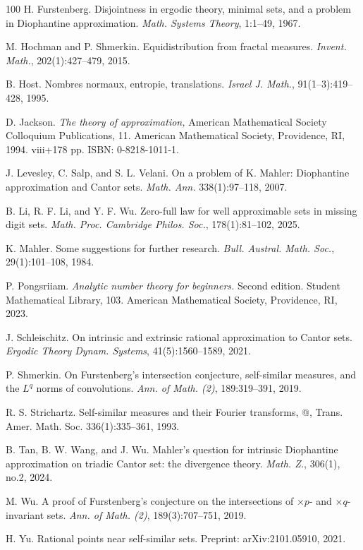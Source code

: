 \documentclass[amssymb,amsfonts,refcheck,12pt,verbatim,righttag]{amsart}
\makeatletter
\numberwithin{equation}{section} %
\theoremstyle{plain}
\newcommand{\Rmnum}[1]{\expandafter\@slowromancap\romannumeral #1@}
\makeatother
\begin{document}
\begin{thebibliography}{100}
H. Furstenberg.
Disjointness in ergodic theory, minimal sets, and a problem in Diophantine approximation.
{\em Math. Systems Theory}, 1:1--49,  1967.

M. Hochman and P. Shmerkin.
Equidistribution from fractal measures. 
{\em Invent. Math.}, 202(1):427--479, 2015.

B. Host.
Nombres normaux, entropie, translations. 
{\em Israel J. Math.}, 91(1--3):419--428, 1995.

 D. Jackson. \textit{The theory of approximation,} American Mathematical Society Colloquium Publications, 11. American Mathematical Society, Providence, RI, 1994. viii+178 pp. ISBN: 0-8218-1011-1.


J. Levesley, C. Salp, and S. L. Velani.
On a problem of K. Mahler: Diophantine approximation and Cantor sets. 
{\em Math. Ann.} 338(1):97--118, 2007.

B. Li, R. F. Li, and Y. F. Wu.
Zero-full law for well approximable sets in missing digit sets. 
{\em Math. Proc. Cambridge Philos. Soc.}, 178(1):81--102, 2025.

K. Mahler. Some suggestions for further research. {\em  Bull. Austral. Math. Soc.}, 29(1):101--108, 1984.

P. Pongsriiam.
{\em Analytic number theory for beginners.}
Second edition. Student Mathematical Library, 103. American Mathematical Society, Providence, RI, 2023.


J. Schleischitz. On intrinsic and extrinsic rational approximation to Cantor sets. {\em Ergodic Theory Dynam. Systems}, 41(5):1560--1589, 2021.

P. Shmerkin.
On Furstenberg's intersection conjecture, self-similar measures, and the $L^q$ norms of convolutions. 
{\em Ann. of Math. (2)},  189:319--391, 2019.

R. S. Strichartz. Self-similar measures and their Fourier transforms, \Rmnum{2}, Trans. Amer.
Math. Soc. 336(1):335–361, 1993.

B. Tan, B. W. Wang, and J. Wu.
Mahler's question for intrinsic Diophantine approximation on triadic Cantor set: the divergence theory. 
{\em Math. Z.}, 306(1), no.2, 2024.

M. Wu.
A proof of Furstenberg's conjecture on the intersections of $\times p$- and $\times q$-invariant sets. 
{\em Ann. of Math. (2)},  189(3):707--751, 2019.

 H. Yu. Rational points near self-similar sets. Preprint: arXiv:2101.05910, 2021.

\end{thebibliography}
\end{document}
